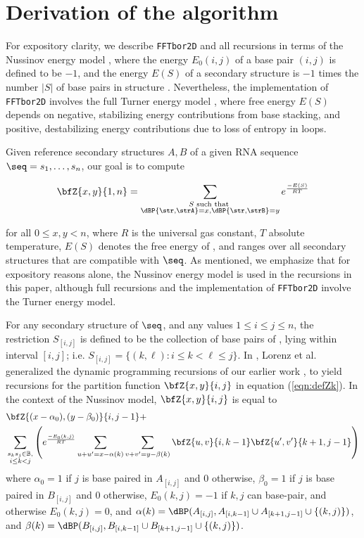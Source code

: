 \section{Derivation of the \ffttwo algorithm}
\label{sec:ffttwo:math}

For expository clarity, we describe {\tt FFTbor2D} and all recursions
in terms of the Nussinov energy model \cite{nussinovJacobson}, where
the energy $E_0(i,j)$ of a base pair $(i,j)$ is defined to be $-1$, and the
energy $E(S)$ of a secondary structure \str is $-1$ times the number $|S|$
of base pairs in structure \str.  Nevertheless, the implementation of
{\tt FFTbor2D} involves the full Turner energy model \cite{xia:RNA}, where
free energy $E(S)$ depends on negative, stabilizing energy contributions
from base stacking, and positive, destabilizing energy contributions due to
loss of entropy in loops.

Given reference secondary structures $A,B$ of a
given RNA sequence $\seq=s_1,\ldots,s_n$, our goal is to compute

\begin{align}
\label{eqn:defZk}
\bfZ{x,y}{1,n} = \sum_{\substack{S \text{ such that }\\
\dBP{\str,\strA} = x, \dBP{\str,\strB}=y}} e^{\frac{-E(S)}{RT}}
\end{align}

for all $0\leq x,y < n$, where $R$ is the universal gas constant, $T$
absolute temperature, $E(S)$ denotes the free energy of \str, and \str ranges
over all secondary structures that are compatible with $\seq$. As mentioned,
we emphasize that for expository reasons alone, the Nussinov energy model is
used in the recursions in this paper, although full recursions and
the implementation of {\tt FFTbor2D} involve the Turner energy model.

For any secondary structure \str of $\seq$, and any values
$1\leq i\leq j \leq n$, the restriction $S_{[i,j]}$ is defined to be the
collection of base pairs of \str, lying within interval $[i,j]$; i.e.
$S_{[i,j]} = \{ (k,\ell) : i \leq k < \ell \leq j\}$.
In \cite{hofacker:RNAbor2D}, Lorenz et al. generalized
the dynamic programming recursions of our earlier work \cite{Freyhult.b07},
to yield recursions
for the partition function $\bfZ{x,y}{i,j}$ in equation
(\ref{eqn:defZk}).  In the context of the Nussinov model,
$\bfZ{x,y}{i,j}$ is equal to
\begin{align}
\label{eqn:RNAborNussRecursion}
&\bfZ{(x-\alpha_0),(y-\beta_0)}{i,j-1} +  \\
&\sum_{\substack{s_k s_j \in \mathbb{B},\\i\le k<j}}
\left(e^{\frac{-E_0(k,j)}{RT}}
\sum_{u+u'=x-\alpha(k)} \sum_{v+v'=y-\beta(k)}
\bfZ{u,v}{i,k-1}  \bfZ{u',v'}{k+1,j-1} \right) \nonumber
\end{align}
where $\alpha_0 = 1$ if $j$ is base paired in $A_{[i,j]}$ and $0$ otherwise,
$\beta_0 = 1$ if $j$ is base paired in $B_{[i,j]}$ and $0$ otherwise,
$E_0(k,j)=-1$ if $k,j$ can base-pair, and otherwise $E_0(k,j)=0$, and
$\alpha(k)=\dBP(A_{[i,j]}, A_{[i,k-1]} \cup A_{[k+1,j-1]} \cup\{(k,j)\})$,
and
$\beta(k)=\dBP(B_{[i,j]}, B_{[i,k-1]} \cup B_{[k+1,j-1]} \cup\{(k,j)\})$.

